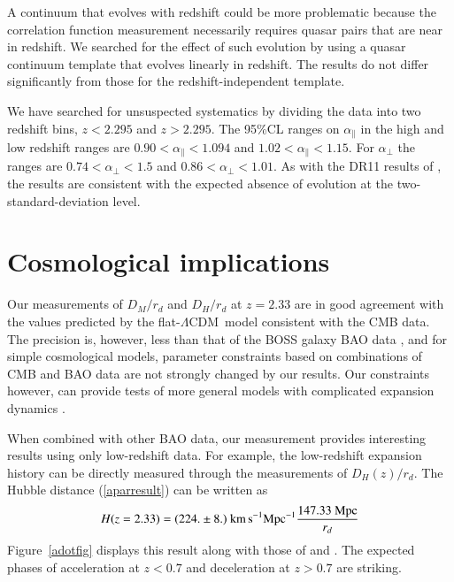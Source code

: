 \documentclass{aa}
\newcommand{\apar}{\alpha_\parallel}
\newcommand{\aperp}{\alpha_\perp}
\newcommand{\DM}{D_M}
\newcommand{\DHub}{D_H}
\newcommand{\lcdm}{$\Lambda$CDM~}
\begin{document}
A continuum that evolves with redshift could be more problematic
because the correlation function measurement  necessarily requires quasar
pairs that are near in redshift.
We searched for the effect of such evolution by using a
quasar continuum template
that evolves linearly in redshift.
The results
do not differ significantly from those for the redshift-independent
template.


We have searched for unsuspected systematics
by dividing the data into two redshift bins, $z<2.295$ and $z>2.295$.
The 95\%CL ranges on   $\apar$  in the high and low redshift
ranges are
$0.90<\apar<1.094$ and $1.02<\apar<1.15$.
For $\aperp$ the ranges are
$0.74<\aperp<1.5$ and $0.86<\aperp<1.01$.
As with the DR11 results of \citet{2015A&A...574A..59D},
the results are consistent
with the expected absence of  evolution at the two-standard-deviation level.





\section{Cosmological implications}
\label{cosmosec}


Our measurements of $\DM/r_d$ and $\DHub/r_d$ at $z=2.33$
are in good agreement with the values predicted by
the flat-\lcdm model consistent with the  CMB data.
The precision is, however,
less than that of the BOSS galaxy BAO data \citep{2016arXiv160703155A},
and
for simple cosmological models,
parameter constraints based on combinations of CMB and BAO data
are not strongly changed by our results.
Our constraints  however,
can provide tests of more general models with
complicated expansion dynamics \citep{2015PhRvD..92l3516A}.


When combined with  other BAO data, our measurement  
provides interesting results using only low-redshift data.
For example, the low-redshift expansion history can be
directly measured through the measurements of $\DHub(z)/r_d$.
The Hubble distance  (\ref{aparresult}) can be written as
\begin{equation}
H(z=2.33) = (224.\pm8.)~{\rm km\,s^{-1}Mpc^{-1}}\frac{147.33~{\rm Mpc}}{r_d}
\end{equation}
Figure~\ref{adotfig}  displays this result along with those of
\citet{2016arXiv160703155A,2011MNRAS.416.3017B,2015MNRAS.449..835R}
and \citet{2014JCAP...05..027F}.
The expected
phases of acceleration at $z<0.7$ and deceleration at
$z>0.7$ are striking.
\end{document}
